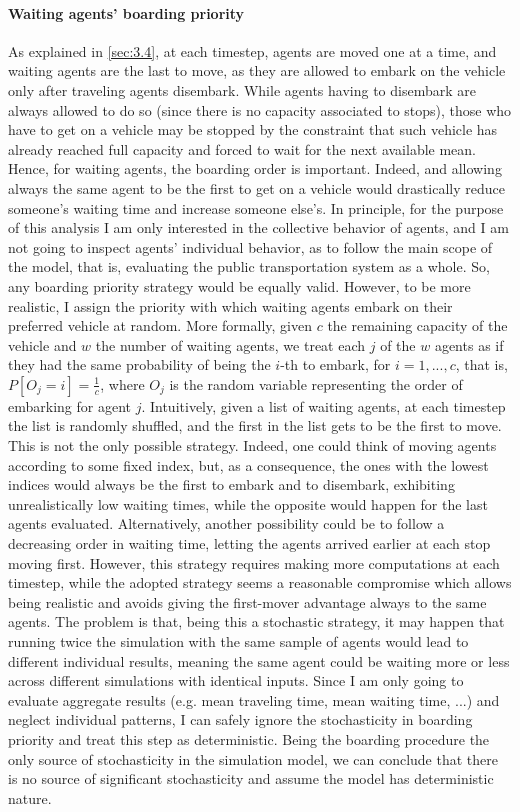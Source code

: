\paragraph{Waiting agents' boarding priority}
As explained in \ref{sec:3.4}, at each timestep, agents are moved one at a time, and waiting agents are the last to move, as they are allowed to embark on the vehicle only after traveling agents disembark. While agents having to disembark are always allowed to do so (since there is no capacity associated to stops), those who have to get on a vehicle may be stopped by the constraint that such vehicle has already reached full capacity and forced to wait for the next available mean. Hence, for waiting agents, the boarding order is important. Indeed, and allowing always the same agent to be the first to get on a vehicle would drastically reduce someone's waiting time and increase someone else's.
In principle, for the purpose of this analysis I am only interested in the collective behavior of agents, and I am not going to inspect agents' individual behavior, as to follow the main scope of the model, that is, evaluating the public transportation system as a whole. So, any boarding priority strategy would be equally valid. However, to be more realistic, I assign the priority with which waiting agents embark on their preferred vehicle at random. More formally, given $c$ the remaining capacity of the vehicle and $w$ the number of waiting agents, we treat each $j$ of the $w$ agents as if they had the same probability of being the $i$-th to embark, for $i = 1, ..., c$, that is, $P[O_j = i] = \frac{1}{c}$, where $O_j$ is the random variable representing the order of embarking for agent $j$. Intuitively, given a list of waiting agents, at each timestep the list is randomly shuffled, and the first in the list gets to be the first to move. This is not the only possible strategy. Indeed, one could think of moving agents according to some fixed index, but, as a consequence, the ones with the lowest indices would always be the first to embark and to disembark, exhibiting unrealistically low waiting times, while the opposite would happen for the last agents evaluated. Alternatively, another possibility could be to follow a decreasing order in waiting time, letting the agents arrived earlier at each stop moving first. However, this strategy requires making more computations at each timestep, while the adopted strategy seems a reasonable compromise which allows being realistic and avoids giving the first-mover advantage always to the same agents. The problem is that, being this a stochastic strategy, it may happen that running twice the simulation with the same sample of agents would lead to different individual results, meaning the same agent could be waiting more or less across different simulations with identical inputs. Since I am only going to evaluate aggregate results (e.g. mean traveling time, mean waiting time, ...) and neglect individual patterns, I can safely ignore the stochasticity in boarding priority and treat this step as deterministic. Being the boarding procedure the only source of stochasticity in the simulation model, we can conclude that there is no source of significant stochasticity and assume the model has deterministic nature.

